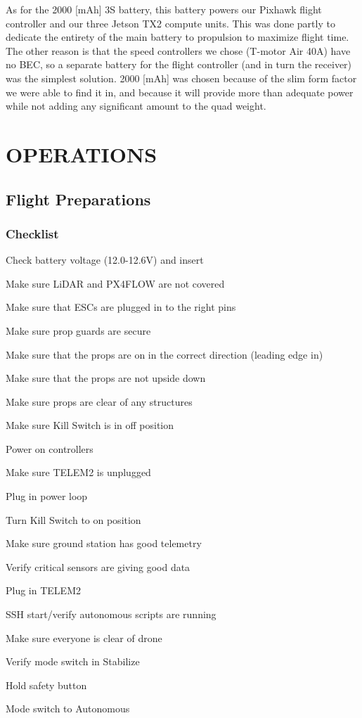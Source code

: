 \documentclass[12pt,letterpaper]{article}
\newenvironment{my_enumerate}{
	\begin{enumerate}
	\setlength{\itemsep}{1pt}
	\setlength{\parskip}{0pt}
	\setlength{\parsep}{0pt}}{\end{enumerate}
}
\begin{document}
		As for the 2000 [mAh] 3S battery, this battery powers our Pixhawk flight controller and our three Jetson TX2 compute units. This was done partly to dedicate the entirety of the main battery to propulsion to maximize flight time. The other reason is that the speed controllers we chose (T-motor Air 40A) have no BEC, so a separate battery for the flight controller (and in turn the receiver) was the simplest solution. 2000 [mAh] was chosen because of the slim form factor we were able to find it in, and because it will provide more than adequate power while not adding any significant amount to the quad weight.


\section*{OPERATIONS}
	\subsection*{Flight Preparations}
		\subsubsection*{Checklist}
			\begin{my_enumerate}
				\item Check battery voltage (12.0-12.6V) and insert
				\item Make sure LiDAR and PX4FLOW are not covered
				\item Make sure that ESCs are plugged in to the right pins
				\item Make sure prop guards are secure
				\item Make sure that the props are on in the correct direction (leading edge in)
				\item Make sure that the props are not upside down
				\item Make sure props are clear of any structures
				\item Make sure Kill Switch is in off position
				\item Power on controllers
				\item Make sure TELEM2 is unplugged
				\item Plug in power loop
				\item Turn Kill Switch to on position
				\item Make sure ground station has good telemetry
				\item Verify critical sensors are giving good data
				\item Plug in TELEM2
				\item SSH start/verify autonomous scripts are running
				\item Make sure everyone is clear of drone
				\item Verify mode switch in Stabilize
				\item Hold safety button
				\item Mode switch to Autonomous
			\end{my_enumerate}
\end{document}
